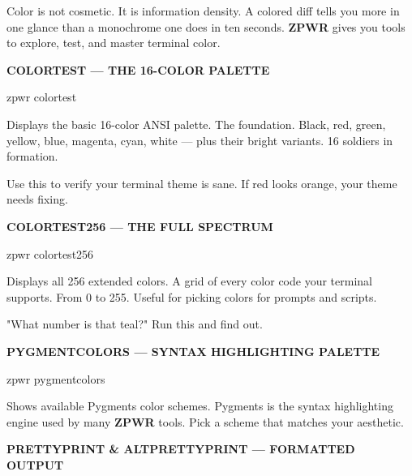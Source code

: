 \documentclass[11pt,a4paper,twoside]{book}
\begin{document}
Color is not cosmetic. It is information density. A colored diff tells you more in one glance than a monochrome one does in ten seconds. \textbf{ZPWR} gives you tools to explore, test, and master terminal color.


\vspace{12pt}
{\bfseries\color{neonyellow} COLORTEST — THE 16-COLOR PALETTE}\vspace{4pt}

\begin{codebox}
\color{neongreen}zpwr colortest\\
\end{codebox}

Displays the basic 16-color ANSI palette. The foundation. Black, red, green, yellow, blue, magenta, cyan, white — plus their bright variants. 16 soldiers in formation.

Use this to verify your terminal theme is sane. If red looks orange, your theme needs fixing.


\vspace{12pt}
{\bfseries\color{neonyellow} COLORTEST256 — THE FULL SPECTRUM}\vspace{4pt}

\begin{codebox}
\color{neongreen}zpwr colortest256\\
\end{codebox}

Displays all 256 extended colors. A grid of every color code your terminal supports. From 0 to 255. Useful for picking colors for prompts and scripts.

"What number is that teal?" Run this and find out.


\vspace{12pt}
{\bfseries\color{neonyellow} PYGMENTCOLORS — SYNTAX HIGHLIGHTING PALETTE}\vspace{4pt}

\begin{codebox}
\color{neongreen}zpwr pygmentcolors\\
\end{codebox}

Shows available Pygments color schemes. Pygments is the syntax highlighting engine used by many \textbf{ZPWR} tools. Pick a scheme that matches your aesthetic.


\vspace{12pt}
{\bfseries\color{neonyellow} PRETTYPRINT \& ALTPRETTYPRINT — FORMATTED OUTPUT}\vspace{4pt}
\end{document}
